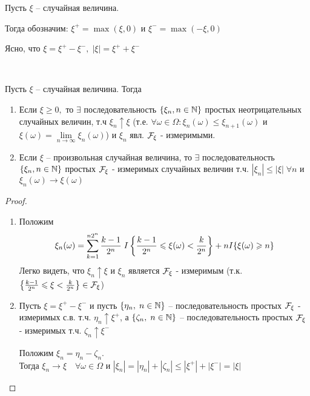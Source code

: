 
\begin{definition}
  Пусть $\xi$ -- случайная величина. 

  Тогда обозначим:
  $\xi^+ = \max(\xi, 0)$  и $\xi^- = \max(-\xi, 0)$

  Ясно, что $\xi = \xi^+ - \xi^-,\;  |\xi| = \xi^+ + \xi^-$
\end{definition}

\begin{theorem}~

  Пусть $\xi$ -- случайная величина. Тогда
  \begin{enumerate}
    \item 
      Если $\xi \geq 0, $ то $\exists$ последовательность $\{ \xi_n, n \in \mathbb{N} \}$ простых неотрицательных случайных величин, т.ч $\xi_n \uparrow \xi$
      (т.е. $\forall \omega \in \Omega : \xi_n(\omega) \leq \xi_{n+1}(\omega)$
      и $\xi(\omega) = \lim\limits_{n \to \infty} \xi_n(\omega)$) 
      и $\xi_n$ явл. $\mathcal{F}_\xi$ - измеримыми.

    \item 
      Если $\xi$ -- произвольная случайная величина, то $\exists$ последовательность 
      $\{ \xi_n, n \in \mathbb{N} \}$ простых $\mathcal{F}_\xi$ - измеримых случайных величин т.ч.  
      $|\xi_n| \leq |\xi| \; \forall n $ и $\xi_n(\omega) \to \xi(\omega)$
  \end{enumerate}
\end{theorem}

\begin{proof}~
  \begin{enumerate}
    \item 
      Положим
      \begin{align*}
        \xi_n(\omega) = \sum_{k = 1}^{n 2^n} \frac{k - 1}{2^n} \;
        I \left\{  \frac{k - 1}{2^n} \leqslant \xi(\omega) < \frac{k}{2^n}  \right\} + n I\{\xi(\omega) \geqslant n\}
      \end{align*}
      Легко видеть, что $\xi_n \uparrow \xi$ и $\xi_n$ является $\mathcal{F}_\xi$ - измеримым
      (т.к. $\left\{ \frac{k - 1}{2^n} \leqslant \xi < \frac{k}{2^n} \right\} \in \mathcal{F}_\xi$)

    \item 
      Пусть $\xi = \xi^+ - \xi^-$ и пусть $\{\eta_n,\; n \in \mathbb{N} \}$ -- последовательность
      простых $\mathcal{F}_\xi$ - измеримых с.в. т.ч. $\eta_n \uparrow \xi^+$, а
      $\{ \zeta_n,\; n \in \mathbb{N} \}$ -- последовательность простых $\mathcal{F}_\xi$ - измеримых
      т.ч. $\zeta_n \uparrow \xi^{-}$

      Положим $\xi_n = \eta_n - \zeta_n$.\\
      Тогда $\xi_n \to \xi \quad \forall \omega \in \Omega$ и 
      $|\xi_n| = |\eta_n| + |\zeta_n| \leq |\xi^+| + |\xi^-| = |\xi|$
   \end{enumerate}
\end{proof}

